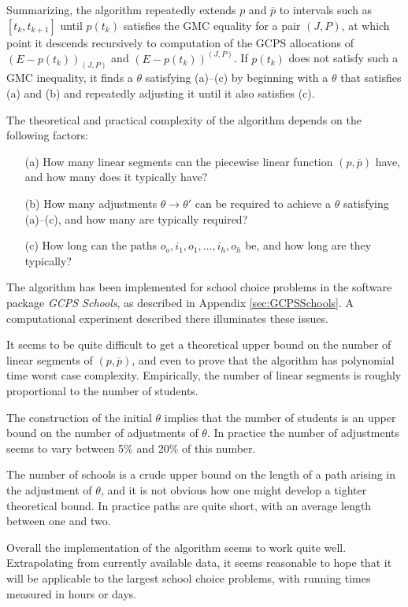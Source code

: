 \documentclass[12pt, A4paper]{article}
\theoremstyle{definition}
\newcommand{\barp}{\overline{p}}
\begin{document}
Summarizing, the algorithm repeatedly extends $p$ and $\barp$ to intervals such as $[t_k,t_{k+1}]$ until $p(t_k)$ satisfies the GMC equality for a pair $(J,P)$, at which point it descends recursively to computation of the GCPS allocations of $(E - p(t_k))_{(J,P)}$ and $(E - p(t_k))^{(J,P)}$. If $p(t_k)$ does not satisfy such a GMC inequality, it finds a $\theta$ satisfying (a)--(c) by beginning with a $\theta$ that satisfies (a) and (b) and repeatedly adjusting it until it also satisfies (c).

The theoretical and practical complexity of the algorithm depends on the following factors:
\begin{enumerate}
  \item[(a)] How many linear segments can the piecewise linear function $(p,\barp)$ have, and how many does it typically have?
  \item[(b)] How many adjustments $\theta \to \theta'$ can be required to achieve a $\theta$ satisfying (a)--(c), and how many are typically required?
  \item[(c)] How long can the paths $o_o, i_1, o_1, \ldots, i_h, o_h$ be, and how long are they typically?
\end{enumerate}
The algorithm has been implemented for school choice problems in the software package \emph{GCPS Schools}, as described in Appendix \ref{sec:GCPSSchools}.  A computational experiment described there illuminates these issues.

It seems to be quite difficult to get a theoretical upper bound on the number of linear segments of $(p,\barp)$, and even to prove that the algorithm has polynomial time worst case complexity.  Empirically, the number of linear segments is roughly proportional to the number of students.

The construction of the initial $\theta$ implies that the number of students is an upper bound on the number of adjustments of $\theta$.  In practice the number of adjustments seems to vary between 5\% and 20\% of this number.

The number of schools is a crude  upper bound on the length of a path arising in the adjustment of $\theta$, and it is not obvious how one might develop a tighter theoretical bound.  In practice paths are quite short, with an average length between one and two.

Overall the implementation of the algorithm seems to work quite well.  Extrapolating from currently available data, it seems reasonable to hope that it will be applicable to the largest school choice problems, with running times measured in hours or days.
\end{document}

